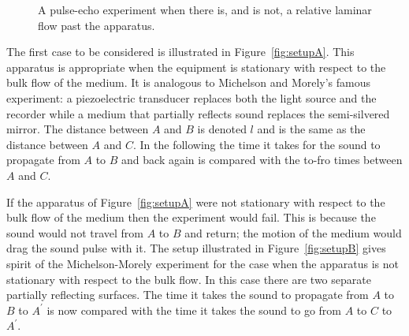 \documentclass[10pt, fleqn,final,showtrims,oldfontcommands, article,a4paper,oneside]{memoir} %
\newcommand{\figref}[1]{Figure~\ref{fig:#1}}
\begin{document}


 \begin{figure}[t]
      \centering
\hspace{2cm}
\label{fig:setups}
      \caption{A pulse-echo experiment when there is, and is not, a relative laminar flow past the apparatus.}
 \end{figure}
The first case to be considered is illustrated in \figref{setupA}.
This apparatus is appropriate when the equipment is stationary with respect to the bulk flow of the medium.
It is  analogous to  Michelson and Morely's famous experiment:
a piezoelectric transducer  replaces both the light source and the recorder while a medium that partially reflects sound  replaces the semi-silvered mirror.
The distance between $A$ and $B$ is denoted $l$ and is the same  as the distance between $A$ and $C$.
In the following the time it takes for the sound to propagate from $A$ to $B$ and back again is compared with the to-fro times between $A$ and $C$.


If the apparatus of \figref{setupA} were not stationary with respect to the bulk flow of the medium then the experiment would fail.
This is because the sound would not travel from  $A$ to $B$ and return;
the motion of the medium would drag the sound pulse with it.
The setup illustrated in \figref{setupB} gives spirit of the Michelson-Morely experiment for the case when the apparatus is not stationary with respect to the bulk flow.
In this case there are two separate partially reflecting surfaces.
The time it takes the sound to propagate from $A$ to $B$ to $A^\prime$ is now compared with the time it takes the sound 
to go from $A$ to $C$ to $A^\prime$.
\end{document}
